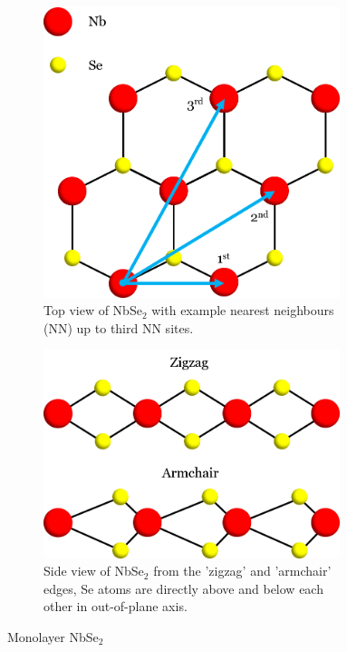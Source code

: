 \documentclass[12pt]{report} %
\begin{document}
\begin{figure}[t]
\centering
  \begin{subfigure}[t]{0.45\textwidth}
    \centering
    \includegraphics[width=0.95\textwidth]{NbSe_top.png}
    \caption{
      Top view of NbSe$_2$ with example nearest neighbours (NN) up to third NN sites.
    }
  \end{subfigure}
  \hfill
  \begin{subfigure}[t]{0.45\textwidth}
    \centering
    \includegraphics[width=0.95\textwidth]{NbSe_side.png}
    \caption{
      Side view of NbSe$_2$ from the 'zigzag' and 'armchair' edges, Se atoms are directly above and below each other in out-of-plane axis.
    }
  \end{subfigure}
  \caption{
    Monolayer NbSe$_2$
  }
\end{figure}
\end{document}
